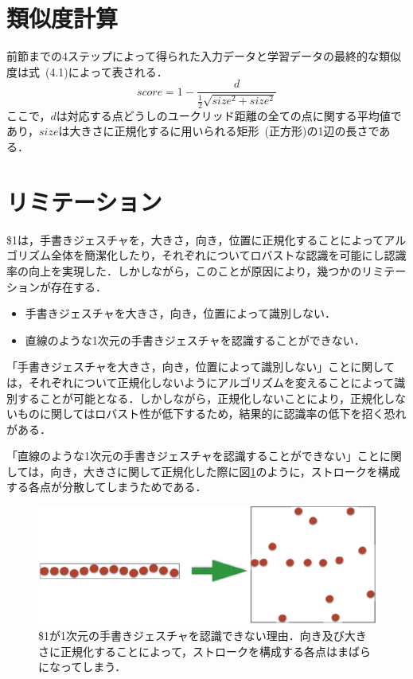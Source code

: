 \section{類似度計算}
前節までの4ステップによって得られた入力データと学習データの最終的な類似度は式~(4.1)によって表される．
\begin{equation}
score = 1 - \frac{d}{\frac{1}{2}\sqrt{size^2 + size^2}}
\end{equation}
ここで，$d$は対応する点どうしのユークリッド距離の全ての点に関する平均値であり，$size$は大きさに正規化するに用いられる矩形~(正方形)の1辺の長さである．

\section{リミテーション}
\$1は，手書きジェスチャを，大きさ，向き，位置に正規化することによってアルゴリズム全体を簡潔化したり，それぞれについてロバストな認識を可能にし認識率の向上を実現した．しかしながら，このことが原因により，幾つかのリミテーションが存在する．

\begin{itemize}
\item 手書きジェスチャを大きさ，向き，位置によって識別しない．
\item 直線のような1次元の手書きジェスチャを認識することができない．
\end{itemize}


「手書きジェスチャを大きさ，向き，位置によって識別しない」ことに関しては，それぞれについて正規化しないようにアルゴリズムを変えることによって識別することが可能となる．しかしながら，正規化しないことにより，正規化しないものに関してはロバスト性が低下するため，結果的に認識率の低下を招く恐れがある．

「直線のような1次元の手書きジェスチャを認識することができない」ことに関しては，向き，大きさに関して正規化した際に図\ref{fig:line}のように，ストロークを構成する各点が分散してしまうためである．

\begin{figure} [!h]
\centering
\includegraphics [width=0.8\columnwidth]{img/line.eps}
\caption{\$1が1次元の手書きジェスチャを認識できない理由．向き及び大きさに正規化することによって，ストロークを構成する各点はまばらになってしまう．}
\label{fig:line}
\end{figure}

